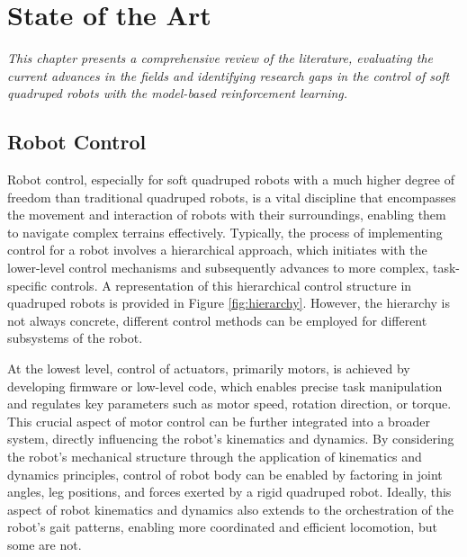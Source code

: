 \chapter{State of the Art}
\label{chap2}
\textit{This chapter presents a comprehensive review of the literature, evaluating the current advances in the fields and identifying research gaps in the control of soft quadruped robots with the model-based reinforcement learning.}

\section{Robot Control}
Robot control, especially for soft quadruped robots with a much higher degree of freedom than traditional quadruped robots, is a vital discipline that encompasses the movement and interaction of robots with their surroundings, enabling them to navigate complex terrains effectively\cite{biswal2021Development}. Typically, the process of implementing control for a robot involves a hierarchical approach\cite{fazeli2019See}, which initiates with the lower-level control mechanisms and subsequently advances to more complex, task-specific controls. A representation of this hierarchical control structure in quadruped robots is provided in Figure \ref{fig:hierarchy}. However, the hierarchy is not always concrete, different control methods can be employed for different subsystems of the robot.

At the lowest level, control of actuators, primarily motors, is achieved by developing firmware or low-level code\cite{yang2020Magnetic}, which enables precise task manipulation and regulates key parameters such as motor speed, rotation direction, or torque. This crucial aspect of motor control can be further integrated into a broader system, directly influencing the robot's kinematics and dynamics\cite{ding2020Novel}. By considering the robot's mechanical structure through the application of kinematics and dynamics principles, control of robot body can be enabled by factoring in joint angles, leg positions, and forces exerted by a rigid quadruped robot\cite{lee2020Learning}. Ideally, this aspect of robot kinematics and dynamics also extends to the orchestration of the robot's gait patterns, enabling more coordinated and efficient locomotion, but some are not\cite{ding2020Novel}.

